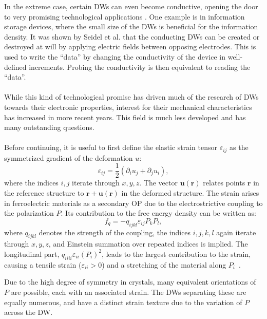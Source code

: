 In the extreme case, certain DWs can even become conductive, opening the door to very promising technological applications \cite{Seidel2009}.
One example is in information storage devices, where the small size of the DWs is beneficial for the information density.
It was shown by Seidel et al.\cite{Seidel2009} that the conducting DWs can be created or destroyed at will by applying electric fields between opposing electrodes. This is used to write the ``data'' by changing the conductivity of the device in well-defined increments.
Probing the conductivity is then equivalent to reading the ``data''. 
\\\\
While this kind of technological promise has driven much of the research of DWs towards their electronic properties, interest for their mechanical characteristics has increased in more recent years.
This field is much less developed and has many outstanding questions.
\\\\
Before continuing, it is useful to first define the elastic strain tensor $\varepsilon_{ij}$ as the symmetrized gradient of the deformation $u$:
\begin{equation}
\varepsilon_{ij} = \frac{1}{2}(\partial_i u_j + \partial_j u_i),
\end{equation}
where the indices $i,j$ iterate through $x, y, z$.
The vector $\bm{u}(\bm{r})$ relates points $\bm{r}$ in the reference structure to $\bm{r} + \bm{u}(\bm{r})$ in the deformed structure.
The strain arises in ferroelectric materials as a secondary OP due to the electrostrictive coupling to the polarization $P$.
Its contribution to the free energy density can be written as:
\begin{equation}
	\label{eq:BTO_electrostriction}
	f_{q}=-q_{ijkl}\varepsilon_{ij}P_{k}P_{l},
\end{equation}
where $q_{ijkl}$ denotes the strength of the coupling, the indices $i, j, k, l$ again iterate through $x, y, z$, and Einstein summation over repeated indices is implied.
The longitudinal part, $q_{iiii} \varepsilon_{ii} (P_i)^2$, leads to the largest contribution to the strain, causing a tensile strain ($\varepsilon_{ii}>0$) and a stretching of the material along $P_i$~\cite{Marton2010}.

Due to the high degree of symmetry in crystals, many equivalent orientations of $P$ are possible, each with an associated strain. The DWs separating these are equally numerous, and have a distinct strain texture due to the variation of $P$ across the DW.

